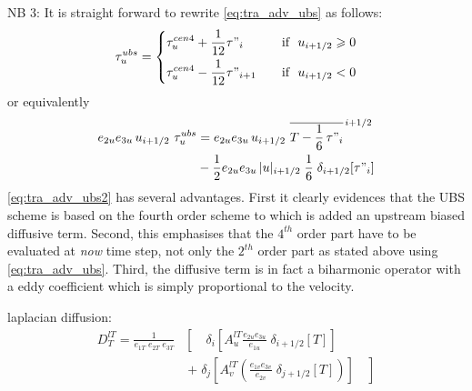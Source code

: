 \documentclass[../tex_main/NEMO_manual]{subfiles}
\begin{document}
NB 3: It is straight forward to rewrite \autoref{eq:tra_adv_ubs} as follows:
\begin{equation} \label{eq:tra_adv_ubs2}
\tau_u^{ubs} = \left\{	 \begin{aligned}
	& \tau_u^{cen4} + \frac{1}{12} \tau"_i		& \quad \text{if }\ u_{i+1/2} \geqslant 0 \\
	& \tau_u^{cen4} - \frac{1}{12} \tau"_{i+1}	& \quad \text{if }\ u_{i+1/2}       <       0
  						 \end{aligned}    \right.
\end{equation}
or equivalently 
\begin{equation} \label{eq:tra_adv_ubs2}
\begin{split}
e_{2u} e_{3u}\,u_{i+1/2} \ \tau_u^{ubs} 
&= e_{2u} e_{3u}\,u_{i+1/2} \ \overline{ T - \frac{1}{6}\,\tau"_i }^{\,i+1/2} \\
& - \frac{1}{2} e_{2u} e_{3u}\,|u|_{i+1/2} \;\frac{1}{6} \;\delta_{i+1/2}[\tau"_i]
\end{split}
\end{equation}
\autoref{eq:tra_adv_ubs2} has several advantages.
First it clearly evidences that the UBS scheme is based on the fourth order scheme to which
is added an upstream biased diffusive term.
Second, this emphasises that the $4^{th}$ order part have to be evaluated at \emph{now} time step,
not only the $2^{th}$ order part as stated above using \autoref{eq:tra_adv_ubs}.
Third, the diffusive term is in fact a biharmonic operator with a eddy coefficient which
is simply proportional to the velocity.

laplacian diffusion:
\begin{equation} \label{eq:tra_ldf_lap}
\begin{split}
D_T^{lT} =\frac{1}{e_{1T} \; e_{2T}\;  e_{3T} } &\left[ {\quad \delta_i 
\left[ {A_u^{lT} \frac{e_{2u} e_{3u} }{e_{1u} }\;\delta_{i+1/2} 
\left[ T \right]} \right]} \right.
\\
&\ \left. {+\; \delta_j \left[ 
{A_v^{lT} \left( {\frac{e_{1v} e_{3v} }{e_{2v} }\;\delta_{j+1/2} \left[ T 
\right]} \right)} \right]\quad } \right]
\end{split}
\end{equation}
\end{document}

